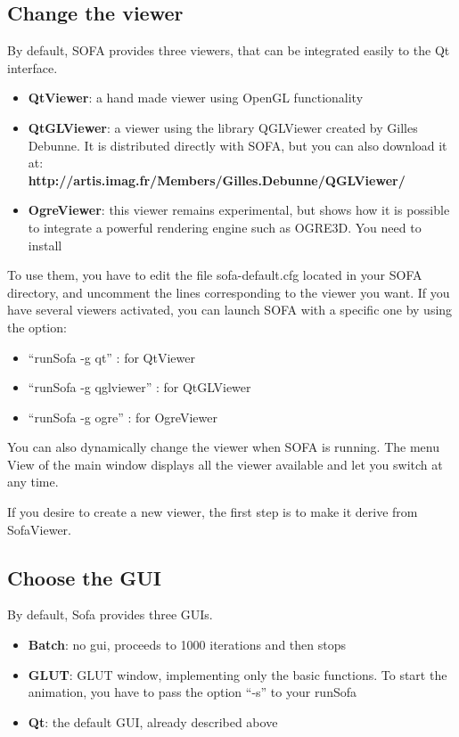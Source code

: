 \subsection{Change the viewer}
By default, SOFA provides three viewers, that can be integrated easily to the Qt interface. 

\begin{itemize}
 \item {\bf QtViewer}: a hand made viewer using OpenGL functionality
 \item {\bf QtGLViewer}: a viewer using the library QGLViewer created by Gilles Debunne. It is distributed directly with SOFA, but you can also download it at:\\ {\bf http://artis.imag.fr/Members/Gilles.Debunne/QGLViewer/}
 \item {\bf OgreViewer}: this viewer remains experimental, but shows how it is possible to integrate a powerful rendering engine such as OGRE3D. You need to install 
\end{itemize}

To use them, you have to edit the file sofa-default.cfg located in your SOFA directory, and uncomment the lines corresponding to the viewer you want. If you have several viewers activated, you can launch SOFA with a specific one by using the option:
\begin{itemize}
 \item ``runSofa -g qt'' : for QtViewer
 \item ``runSofa -g qglviewer'' : for QtGLViewer
 \item ``runSofa -g ogre'' : for OgreViewer
\end{itemize}

You can also dynamically change the viewer when SOFA is running. The menu View of the main window displays all the viewer available and let you switch at any time.
\par
If you desire to create a new viewer, the first step is to make it derive from SofaViewer. 








\subsection{Choose the GUI}
By default, Sofa provides three GUIs.
\begin{itemize}
 \item {\bf Batch}: no gui, proceeds to 1000 iterations and then stops
 \item {\bf GLUT}: GLUT window, implementing only the basic functions. To start the animation, you have to pass the option ``-s'' to your runSofa
 \item {\bf Qt}: the default GUI, already described above
\end{itemize}

